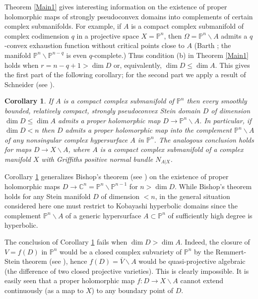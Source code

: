 \documentclass[11pt]{amsart}
\numberwithin{equation}{section}
\newtheorem{corollary}[theorem]{Corollary}
\theoremstyle{definition}
\begin{document}
Theorem \ref{Main1} gives interesting information on the
existence of proper holomorphic maps of strongly pseudoconvex
domains into complements of certain complex submanifolds.
For example, if $A$ is a compact complex submanifold of 
complex codimension $q$ in a projective space $X={\mathbb{P}}^n$, 
then $\Omega ={\mathbb{P}}^n{\backslash} A$ admits a $q$-convex exhaustion function without 
critical points close to $A$ (Barth \cite{Barth}; 
the manifold  ${\mathbb{P}}^n{\backslash} {\mathbb{P}}^{n-q}$ is even $q$-complete.)
Thus condition (b) in Theorem \ref{Main1} holds when $r=n-q+1 > \dim D$
or, equivalently, $\dim D\le \dim A$. This gives the first part
of the following corollary; for the second part we apply
a result of Schneider (see \cite[Corollary 2]{Schneider}).

\begin{corollary}
\label{proj-minus}
If $A$ is a compact complex submanifold of ${\mathbb{P}}^n$ 
then every smoothly bounded, relatively compact, 
strongly pseudoconvex Stein domain $D$ 
of dimension $\dim D\le \dim A$ 
admits a proper holomorphic map $D\to {\mathbb{P}}^n{\backslash} A$.
In particular, if $\dim D<n$ then $D$ admits a proper holomorphic 
map into the complement ${\mathbb{P}}^n{\backslash} A$ of any nonsingular complex
hypersurface $A$ in ${\mathbb{P}}^n$.
The analogous conclusion holds for maps $D\to X{\backslash} A$, where $A$ is a 
compact complex submanifold of a complex manifold $X$ 
with Griffiths positive normal bundle $N_{A|X}$.
\end{corollary}

Corollary \ref{proj-minus} generalizes Bishop's theorem 
(see \cite{Bishop}) on the existence of proper holomorphic maps
$D\to {\mathbb{C}}^n={\mathbb{P}}^n{\backslash} {\mathbb{P}}^{n-1}$ for $n>\dim D$. 
While Bishop's theorem holds for any Stein manifold $D$
of dimension $<n$, in the general situation considered here
one must restrict to Kobayashi hyperbolic domains since 
the complement ${\mathbb{P}}^n{\backslash} A$ of a generic hypersurface 
$A\subset{\mathbb{P}}^n$ of sufficiently high degree is hyperbolic.

The conclusion of Corollary \ref{proj-minus} fails when 
$\dim D >\dim A$. Indeed, the closure of $V=f(D)$ in ${\mathbb{P}}^n$ 
would be a closed complex subvariety of ${\mathbb{P}}^n$
by the Remmert-Stein theorem (see \cite[p.\ 354]{RS,GRemmert}),
hence $f(D) =\overline V {\backslash} A$ would be quasi-projective algebraic
(the difference of two closed projective varieties). 
This is clearly impossible. It is easily seen that a 
proper holomorphic map $f\colon D\to X{\backslash} A$ 
cannot extend continuously (as a map to $X$) 
to any boundary point of $D$.
\end{document}
